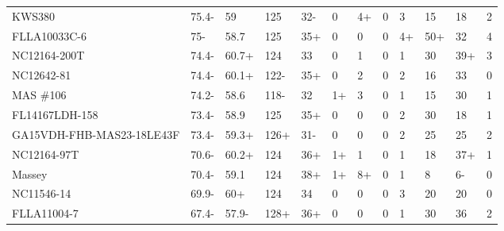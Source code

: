 \documentclass[12pt, letterpaper]{article}
\begin{document}
\begin{landscape}
\begin{ThreePartTable}
\begin{longtable}{llllllllllll}
  KWS380 & 75.4- & 59 & 125 & 32- & 0 & 4+ & 0 & 3 & 15 & 18 & 2 \\ 
  FLLA10033C-6 & 75- & 58.7 & 125 & 35+ & 0 & 0 & 0 & 4+ & 50+ & 32 & 4 \\ 
  NC12164-200T & 74.4- & 60.7+ & 124 & 33 & 0 & 1 & 0 & 1 & 30 & 39+ & 3 \\ 
  NC12642-81 & 74.4- & 60.1+ & 122- & 35+ & 0 & 2 & 0 & 2 & 16 & 33 & 0 \\ 
  MAS \#106 & 74.2- & 58.6 & 118- & 32 & 1+ & 3 & 0 & 1 & 15 & 30 & 1 \\ 
  FL14167LDH-158 & 73.4- & 58.9 & 125 & 35+ & 0 & 0 & 0 & 2 & 30 & 18 & 1 \\ 
  GA15VDH-FHB-MAS23-18LE43F & 73.4- & 59.3+ & 126+ & 31- & 0 & 0 & 0 & 2 & 25 & 25 & 2 \\ 
  NC12164-97T & 70.6- & 60.2+ & 124 & 36+ & 1+ & 1 & 0 & 1 & 18 & 37+ & 1 \\ 
  Massey & 70.4- & 59.1 & 124 & 38+ & 1+ & 8+ & 0 & 1 & 8 & 6- & 0 \\ 
  NC11546-14 & 69.9- & 60+ & 124 & 34 & 0 & 0 & 0 & 3 & 20 & 20 & 0 \\ 
  FLLA11004-7 & 67.4- & 57.9- & 128+ & 36+ & 0 & 0 & 0 & 1 & 30 & 36 & 2 \\ 

\end{longtable}
\end{ThreePartTable}

\newpage


\end{landscape}
\end{document}
